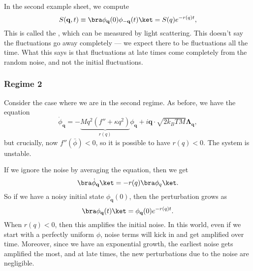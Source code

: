 \documentclass[a4paper]{article}
\begin{document}
In the second example sheet, we compute
\[
  S(\mathbf{q}, t) \equiv \bra \phi_\mathbf{q}(0) \phi_{-\mathbf{q}} (t)\ket = S(q) e^{-r(q) t},
\]
This  is called the , which can be measured by light scattering. This doesn't say the fluctuations go away completely --- we expect there to be fluctuations all the time. What this says is that fluctuations at late times come completely from the random noise, and not the initial fluctuations.

\subsubsection*{Regime 2}
Consider the case where we are in the second regime. As before, we have the equation
\[
  \dot{\phi}_{\mathbf{q}} = - \underbrace{M q^2 (f'' + \kappa q^2)}_{r(q)}\phi_\mathbf{q} + i\mathbf{q} \cdot \sqrt{2k_B TM} \boldsymbol\Lambda_{\mathbf{q}},
\]
but crucially, now $f''(\bar{\phi}) < 0$, so it is possible to have $r(q) < 0$. The system is unstable.

If we ignore the noise by averaging the equation, then we get
\[
  \bra \dot{\phi}_\mathbf{q}\ket = - r(q) \bra \phi_q\ket.
\]
So if we have a noisy initial state $\phi_\mathbf{q}(0)$, then the perturbation grows as
\[
  \bra \phi_\mathbf{q}(t)\ket = \phi_\mathbf{q}(0) e^{-r(q)t}.
\]
When $r(q) < 0$, then this amplifies the initial noise. In this world, even if we start with a perfectly uniform $\phi$, noise terms will kick in and get amplified over time. Moreover, since we have an exponential growth, the earliest noise gets amplified the most, and at late times, the new perturbations due to the noise are negligible.
\end{document}
